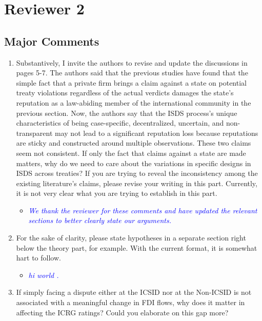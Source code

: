 \section{Reviewer 2}

\subsection{Major Comments}

\begin{enumerate}
	\item Substantively, I invite the authors to revise and update the discussions in pages 5-7. The authors said that the previous studies have found that the simple fact that a private firm brings a claim against a state on potential treaty violations regardless of the actual verdicts damages the state’s reputation as a law-abiding member of the international community in the previous section. Now, the authors say that the ISDS process’s unique characteristics of being case-specific, decentralized, uncertain, and non-transparent may not lead to a significant reputation loss because reputations are sticky and constructed around multiple observations. These two claims seem not consistent. If only the fact that claims against a state are made matters, why do we need to care about the variations in specific designs in ISDS across treaties? If you are trying to reveal the inconsistency among the existing literature’s claims, please revise your writing in this part. Currently, it is not very clear what you are trying to establish in this part.
	\begin{itemize}
		\item \textcolor{blue}{ \emph{ 
		We thank the reviewer for these comments and have updated the relevant sections to better clearly state our arguments. 
		}}
	\end{itemize}
	\item For the sake of clarity, please state hypotheses in a separate section right below the theory part, for example. With the current format, it is somewhat hart to follow.	
	\begin{itemize}
		\item \textcolor{blue}{ \emph{ hi world . }}
	\end{itemize}
	\item If simply facing a dispute either at the ICSID nor at the Non-ICSID is not associated with a meaningful change in FDI flows, why does it matter in affecting the ICRG ratings? Could you elaborate on this gap more?	
	\begin{itemize}

\end{itemize}
\end{enumerate}
